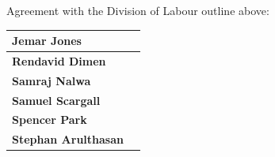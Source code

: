 \documentclass[]{article}
\begin{document}
\noindent Agreement with the Division of Labour outline above:

\noindent\begin{tabularx}{\linewidth}{|l|X|}
	\hline
	\rule{0pt}{2em} \textbf{Jemar Jones} & \\
	\hline
	\rule{0pt}{2em} \textbf{Rendavid Dimen} & \\
	\hline
	\rule{0pt}{2em} \textbf{Samraj Nalwa} & \\
	\hline
	\rule{0pt}{2em} \textbf{Samuel Scargall} & \\
	\hline
	\rule{0pt}{2em} \textbf{Spencer Park} & \\
	\hline
	\rule{0pt}{2em} \textbf{Stephan Arulthasan} & \\
	\hline
\end{tabularx}
\end{document}
